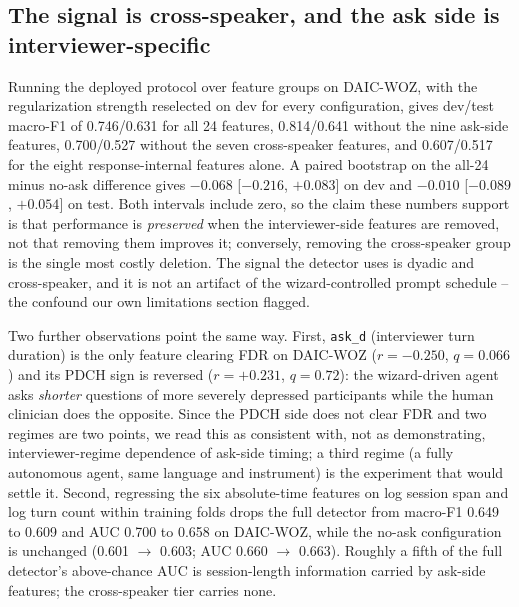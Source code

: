 \documentclass{article}
\begin{document}
\subsection{The signal is cross-speaker, and the ask side is interviewer-specific}
\label{sec:audit-cross}
Running the deployed protocol over feature groups on DAIC-WOZ, with the regularization strength reselected on dev for every configuration, gives dev/test macro-F1 of 0.746/0.631 for all 24 features, 0.814/0.641 without the nine ask-side features, 0.700/0.527 without the seven cross-speaker features, and 0.607/0.517 for the eight response-internal features alone. A paired bootstrap on the all-24 minus no-ask difference gives $-0.068$ [$-0.216$, $+0.083$] on dev and $-0.010$ [$-0.089$, $+0.054$] on test. Both intervals include zero, so the claim these numbers support is that performance is \emph{preserved} when the interviewer-side features are removed, not that removing them improves it; conversely, removing the cross-speaker group is the single most costly deletion. The signal the detector uses is dyadic and cross-speaker, and it is not an artifact of the wizard-controlled prompt schedule -- the confound our own limitations section flagged.

Two further observations point the same way. First, \texttt{ask\_d} (interviewer turn duration) is the only feature clearing FDR on DAIC-WOZ ($r = -0.250$, $q = 0.066$) and its PDCH sign is reversed ($r = +0.231$, $q = 0.72$): the wizard-driven agent asks \emph{shorter} questions of more severely depressed participants while the human clinician does the opposite. Since the PDCH side does not clear FDR and two regimes are two points, we read this as consistent with, not as demonstrating, interviewer-regime dependence of ask-side timing; a third regime (a fully autonomous agent, same language and instrument) is the experiment that would settle it. Second, regressing the six absolute-time features on log session span and log turn count within training folds drops the full detector from macro-F1 0.649 to 0.609 and AUC 0.700 to 0.658 on DAIC-WOZ, while the no-ask configuration is unchanged (0.601 $\rightarrow$ 0.603; AUC 0.660 $\rightarrow$ 0.663). Roughly a fifth of the full detector's above-chance AUC is session-length information carried by ask-side features; the cross-speaker tier carries none.
\end{document}

